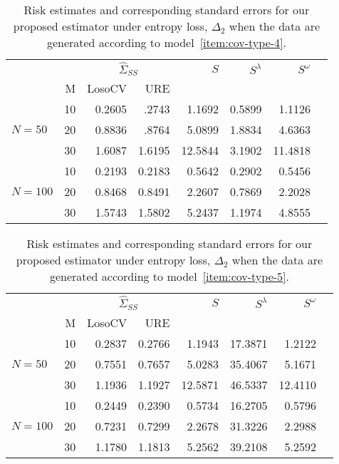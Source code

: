 \documentclass[12pt]{article}
\theoremstyle{definition}
\begin{document}
\begin{table}[H] \label{table:simulation-1-entropy-loss-sigma-4}
\centering
\caption{Risk estimates and corresponding standard errors for our proposed estimator under entropy loss, $\Delta_2$ when the data are generated according to model~\ref{item:cov-type-4}.} \begin{tabular}{l|r|rrrrrr}
&  & \multicolumn{2}{c}{$\hat{\Sigma}_{SS}$} & $S$ & $S^\lambda$ & $S^\omega$ \\ 
&M & \mbox{LosoCV} & \mbox{URE} &  \\ 
  \hline
&    10 & 0.2605 & .2743&  1.1692 & 0.5899 & 1.1126 \\ 
$N = 50$ &    20 & 0.8836 & .8764 & 5.0899 & 1.8834 & 4.6363 \\ 
   &    30 & 1.6087 & 1.6195 &12.5844&3.1902 & 11.4818 \\ \hdashline
 &    10 & 0.2193 & 0.2183 & 0.5642 & 0.2902 & 0.5456 \\ 
  $N = 100$ &    20 & 0.8468 & 0.8491 & 2.2607 & 0.7869 & 2.2028\\ 
   &    30 & 1.5743 & 1.5802 & 5.2437 & 1.1974 & 4.8555 \\
  \end{tabular}
\end{table}


\begin{table}[H] \label{table:simulation-1-entropy-loss-sigma-5}
\centering
\caption{Risk estimates and corresponding standard errors for our proposed estimator under entropy loss, $\Delta_2$ when the data are generated according to model~\ref{item:cov-type-5}.} 
\begin{tabular}{l|r|rrrrrr}
&  & \multicolumn{2}{c}{$\hat{\Sigma}_{SS}$} & $S$ & $S^\lambda$ & $S^\omega$ \\ 
&M & \mbox{LosoCV} & \mbox{URE} &  \\ 
  \hline
 &    10 & 0.2837 & 	  0.2766	& 1.1943 &  17.3871 & 1.2122 \\ 
$N = 50$&    20 & 0.7551& 0.7657& 5.0283& 35.4067 & 5.1671 \\ 
  &    30 & 1.1936 & 1.1927& 12.5871& 46.5337 & 12.4110  \\ \hdashline
 &    10 & 0.2449 &  0.2390 & 0.5734 & 16.2705 & 0.5796\\ 
  $N = 100$ &    20 & 0.7231 & 0.7299 & 2.2678& 31.3226 & 2.2988 \\ 
   &    30 & 1.1780 & 1.1813 & 5.2562 & 39.2108 & 5.2592 \\
  \end{tabular}
\end{table}
\end{document}
